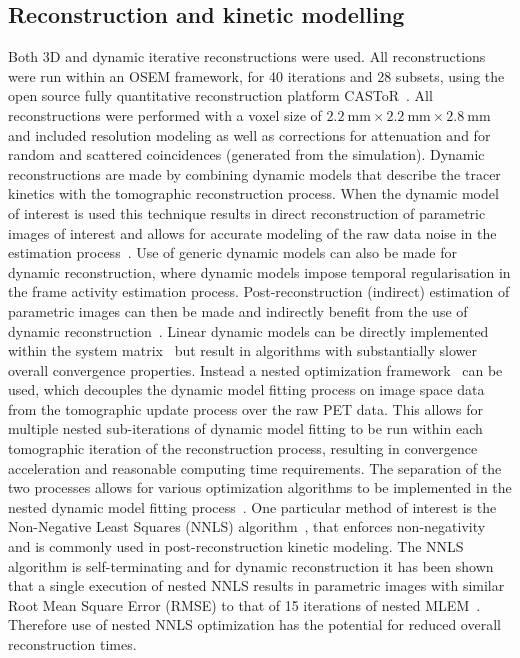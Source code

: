 \subsection*{Reconstruction and kinetic modelling}
Both 3D and dynamic iterative reconstructions were used. All reconstructions were run within an OSEM framework, for 40 iterations and 28 subsets, using the open source fully quantitative reconstruction platform CASToR~\cite{Merlin2018}. 
All reconstructions were performed with a voxel size of $2.2~\mathrm{mm}\times2.2~\mathrm{mm}\times2.8~\mathrm{mm}$ and included resolution modeling as well as corrections for attenuation and for random and scattered coincidences (generated from the simulation).
Dynamic reconstructions are made by combining dynamic models that describe the tracer kinetics with the tomographic reconstruction process. When the dynamic model of interest is used this technique results in direct reconstruction of parametric images of interest and allows for accurate modeling of the raw data noise in the estimation process~\cite{Carson1985,Matthews1995,Kamasak2003,Wang2008}. Use of generic dynamic models can also be made for dynamic reconstruction, where dynamic models impose temporal regularisation in the frame activity estimation process. Post-reconstruction (indirect) estimation of parametric images can then be made and indirectly benefit from the use of dynamic reconstruction~\cite{Reader2014,Novosad2016b}.
Linear dynamic models can be directly implemented within the system matrix~\cite{Matthews1995,Wang2008,Reader2014} but result in algorithms with substantially slower overall convergence properties.
Instead a nested optimization framework~\cite{Wang2010,Matthews2010} can be used, which decouples the dynamic model fitting process on image space data from the tomographic update process over the raw PET data. This allows for multiple nested sub-iterations of dynamic model fitting to be run within each tomographic iteration of the reconstruction process, resulting in convergence acceleration and reasonable computing time requirements.
The separation of the two processes allows for various optimization algorithms to be implemented in the nested dynamic model fitting process~\cite{Matthews2010}. One particular method of interest is the Non-Negative Least Squares (NNLS) algorithm~\cite{Lawson1995}, that enforces non-negativity and is commonly used in post-reconstruction kinetic modeling. The NNLS algorithm is self-terminating and for dynamic reconstruction it has been shown that a single execution of nested NNLS results in parametric images with similar Root Mean Square Error (RMSE) to that of 15 iterations of nested MLEM~\cite{Matthews2010}. Therefore use of nested NNLS optimization has the potential for reduced overall reconstruction times.
